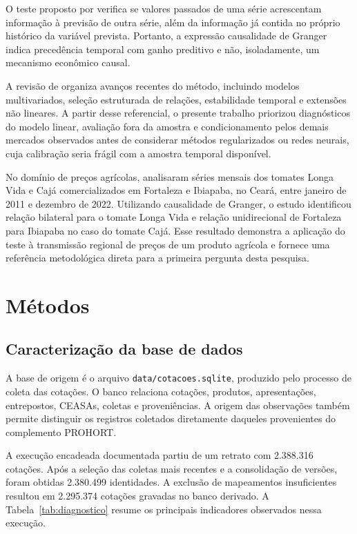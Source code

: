 \documentclass[12pt,a4paper]{article}
\begin{document}
O teste proposto por \textcite{granger1969} verifica se valores passados de uma
série acrescentam informação à previsão de outra série, além da informação já
contida no próprio histórico da variável prevista. Portanto, a expressão
causalidade de Granger indica precedência temporal com ganho preditivo e não,
isoladamente, um mecanismo econômico causal.

A revisão de \textcite{shojaie2022} organiza avanços recentes do método,
incluindo modelos multivariados, seleção estruturada de relações, estabilidade
temporal e extensões não lineares. A partir desse referencial, o presente
trabalho priorizou diagnósticos do modelo linear, avaliação fora da amostra e
condicionamento pelos demais mercados observados antes de considerar métodos
regularizados ou redes neurais, cuja calibração seria frágil com a amostra
temporal disponível.

No domínio de preços agrícolas, \textcite{oliveira2023} analisaram séries
mensais dos tomates Longa Vida e Cajá comercializados em Fortaleza e Ibiapaba,
no Ceará, entre janeiro de 2011 e dezembro de 2022. Utilizando causalidade de
Granger, o estudo identificou relação bilateral para o tomate Longa Vida e
relação unidirecional de Fortaleza para Ibiapaba no caso do tomate Cajá. Esse
resultado demonstra a aplicação do teste à transmissão regional de preços de
um produto agrícola e fornece uma referência metodológica direta para a
primeira pergunta desta pesquisa.


\section{Métodos}

\subsection{Caracterização da base de dados}

A base de origem é o arquivo \texttt{data/cotacoes.sqlite}, produzido pelo
processo de coleta das cotações. O banco relaciona cotações, produtos,
apresentações, entrepostos, CEASAs, coletas e proveniências. A origem das
observações também permite distinguir os registros coletados diretamente
daqueles provenientes do complemento PROHORT.

A execução encadeada documentada partiu de um retrato com 2.388.316 cotações.
Após a seleção das coletas mais recentes e a consolidação de versões, foram
obtidas 2.380.499 identidades. A exclusão de mapeamentos insuficientes resultou
em 2.295.374
cotações gravadas no banco derivado. A Tabela~\ref{tab:diagnostico} resume os
principais indicadores observados nessa execução.
\end{document}
